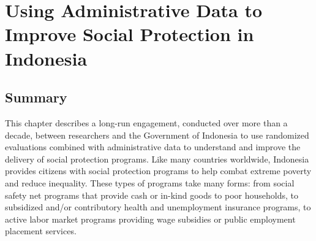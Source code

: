 \hypertarget{indonesia}{%
\chapter{Using Administrative Data to Improve Social Protection in Indonesia}\label{indonesia}}

\hrulefill

\hypertarget{summary-9}{%
\section{Summary}\label{summary-9}}

This chapter describes a long-run engagement, conducted over more than a decade, between researchers and the Government of Indonesia to use randomized evaluations combined with administrative data to understand and improve the delivery of social protection programs. Like many countries worldwide, Indonesia provides citizens with social protection programs to help combat extreme poverty and reduce inequality. These types of programs take many forms: from social safety net programs that provide cash or in-kind goods to poor households, to subsidized and/or contributory health and unemployment insurance programs, to active labor market programs providing wage subsidies or public employment placement services.

